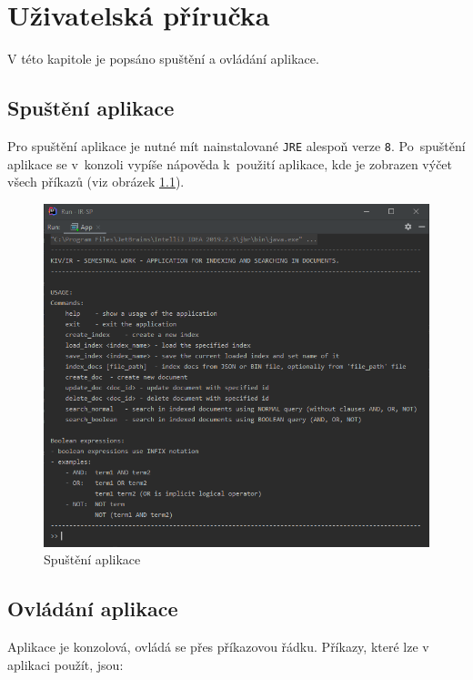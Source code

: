 \documentclass[
11pt,
a4paper,
pdftex,
czech,
titlepage
]{report}
\begin{document}
\chapter{Uživatelská příručka}
V této kapitole je popsáno spuštění a ovládání aplikace. 

\section{Spuštění aplikace}
Pro spuštění aplikace je nutné mít nainstalované \texttt{JRE} alespoň verze \texttt{8}. Po~spuštění aplikace se v~konzoli vypíše nápověda k~použití aplikace, kde je zobrazen výčet všech příkazů (viz obrázek \ref{uziv_spusteni}). 

\begin{figure}[!ht]
	\centering
	\includegraphics[width=1\textwidth]{img/spusteni.png}
	\caption{Spuštění aplikace}
	\label{uziv_spusteni}
\end{figure}
\newpage
\section{Ovládání aplikace}
Aplikace je konzolová, ovládá se přes příkazovou řádku. Příkazy, které lze v aplikaci použít, jsou:
\end{document}
